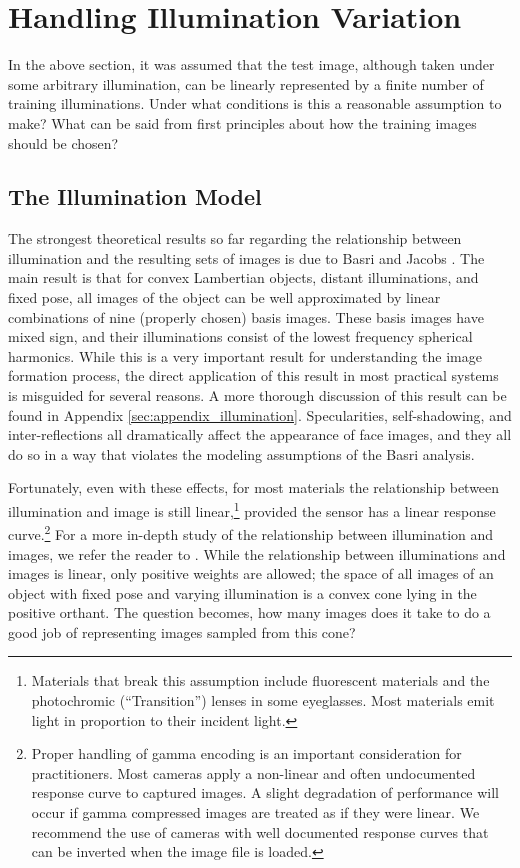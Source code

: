 \section{Handling Illumination Variation}\label{sec:illumination}
In the above section, it was assumed that the test image, although taken under
some arbitrary illumination, can be linearly represented by a finite number of
training illuminations.  Under what conditions is this a reasonable assumption
to make?  What can be said from first principles about how the training images
should be chosen?

\subsection{The Illumination Model}
%
The strongest theoretical results so far regarding the relationship between
illumination and the resulting sets of images is due to Basri and Jacobs
\cite{Basri2003-PAMI}.  The main result is that for convex
Lambertian objects, distant illuminations, and fixed pose, all images of the
object can be well approximated by linear combinations of nine (properly
chosen) basis images.  
These basis images have mixed sign, and their
illuminations consist of the lowest frequency spherical harmonics.  While this
is a very important result for understanding the image formation process, the
direct application of this result in most practical systems is misguided for
several reasons.  
A more thorough discussion of this result can be found in Appendix 
\ref{sec:appendix_illumination}.
Specularities, self-shadowing, and inter-reflections all
dramatically affect the appearance of face images, and they all do so in a way
that violates the modeling assumptions of the Basri analysis.

Fortunately, even with these effects, for most materials the relationship between
illumination and image is still linear,\footnote{Materials that break
this assumption include fluorescent materials and the photochromic (``Transition'') lenses
in some eyeglasses.  Most materials emit light in proportion to their
incident light.} provided the sensor has a linear response curve.\footnote{Proper handling of gamma encoding is an important consideration for
practitioners.  Most cameras apply a non-linear and often undocumented response
curve to captured images.  A slight degradation of performance will occur if
gamma compressed images are treated as if they were linear.  We recommend the use
of cameras with well documented response curves that can be inverted when the
image file is loaded.}
For a more in-depth study
of the relationship between illumination and images, we refer the reader to
\cite{belhumeur1998set}.
While the relationship between illuminations and images is linear,
only positive weights are allowed; the space of all images of an object with
fixed pose and varying illumination is a convex cone lying in the positive
orthant. The question becomes, how many images does it take to do a good job
of representing images sampled from this cone?

